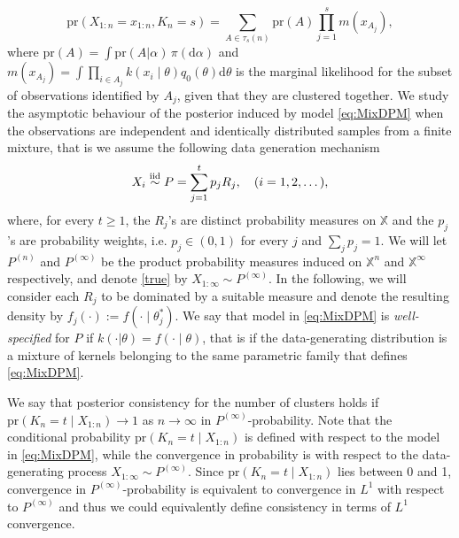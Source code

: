 \documentclass[12pt]{article}
\def\simiid{\stackrel{\mbox{\scriptsize{iid}}}{\sim}}
\begin{document}
\begin{equation}\label{first_step}
\text{pr}( X_{1:n}= x_{1:n}, K_n = s ) = \sum_{A \in \tau_s(n)} \text{pr}( A ) \prod_{j = 1}^s m (x_{A_j} ),
\end{equation} %
where pr$(A)=\int \mbox{pr}(A|\alpha)\,\pi(\mathrm{d}\alpha)$ and
$m(x_{A_j}) = \int \prod_{i \in A_j} k(x_i \mid \theta) q_0(\theta) \mathrm{d}\theta$
is the marginal likelihood for the subset of observations identified by $A_j$, given that they are clustered together. We study the asymptotic behaviour of the posterior induced by model \eqref{eq:MixDPM} when the observations are independent and identically distributed samples from a finite mixture, that is we assume the following data generation mechanism
\begin{equation}\label{true}
X_i \simiid P = \sum_{j = 1}^t p_jR_j, \quad (i = 1, 2,\dots),
\end{equation}
where, for every $t\ge 1$, the $R_j$'s are distinct %
probability measures on $\mathbb{X}$ %
and the $p_j$'s are probability weights, i.e. $p_j\in (0,1)$ for every $j$ and $\sum_j p_j=1$. %
We will let $P^{(n)}$ and $P^{(\infty)}$ be the product probability measures induced on $\mathbb{X}^n$ and $\mathbb{X}^\infty$ respectively, and denote \eqref{true} by $X_{1:\infty}\sim P^{(\infty)}$. %
In the following, we will consider each $R_j$ to be dominated by a suitable measure and denote the resulting density by $f_j(\cdot) := f(\cdot \mid \theta_j^\ast)$. We say that model in \eqref{eq:MixDPM} is \emph{well-specified} for $P$ if $k(\cdot|\theta)=f(\cdot \mid \theta)$, that is if the data-generating distribution is a mixture of kernels belonging to the same parametric family that defines %
\eqref{eq:MixDPM}.

We say that posterior consistency for the number of clusters holds if $\text{pr}(K_n = t \mid X_{1:n}) \to 1$ as $n\to\infty$ in $P^{(\infty)}$-probability. Note that %
the conditional probability $\text{pr}(K_n = t \mid X_{1:n})$ is defined with respect to the model in \eqref{eq:MixDPM}, while the convergence in probability is with respect to the data-generating process $X_{1:\infty}\sim P^{(\infty)}$. Since $\text{pr}(K_n = t \mid X_{1:n})$ lies between 0 and 1, convergence in $P^{(\infty)}$-probability is equivalent to convergence in $L^1$ with respect to $P^{(\infty)}$ and thus we could equivalently define consistency in terms of $L^1$ convergence.
\end{document}

